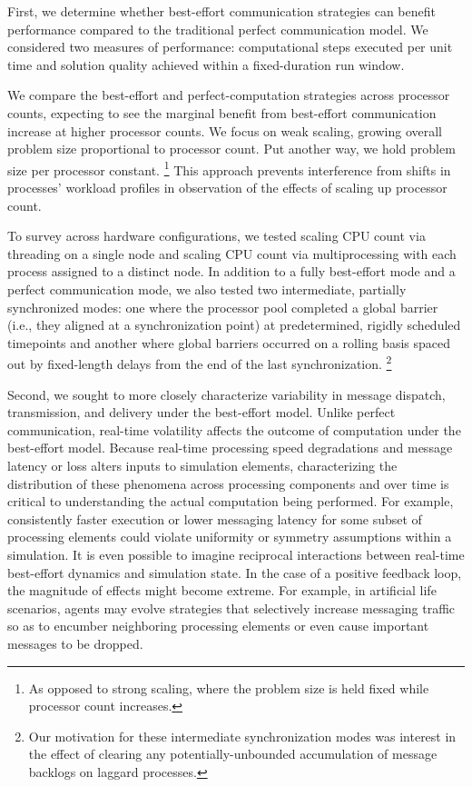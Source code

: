 First, we determine whether best-effort communication strategies can benefit performance compared to the traditional perfect communication model.
We considered two measures of performance: computational steps executed per unit time and solution quality achieved within a fixed-duration run window.

We compare the best-effort and perfect-computation strategies across processor counts, expecting to see the marginal benefit from best-effort communication increase at higher processor counts.
We focus on weak scaling, growing overall problem size proportional to processor count.
Put another way, we hold problem size per processor constant.%
\footnote{
As opposed to strong scaling, where the problem size is held fixed while processor count increases.
}
This approach prevents interference from shifts in processes' workload profiles in observation of the effects of scaling up processor count.

To survey across hardware configurations, we tested scaling CPU count via threading on a single node and scaling CPU count via multiprocessing with each process assigned to a distinct node.
In addition to a fully best-effort mode and a perfect communication mode, we also tested two intermediate, partially synchronized modes: one where the processor pool completed a global barrier (i.e., they aligned at a synchronization point) at predetermined, rigidly scheduled timepoints and another where global barriers occurred on a rolling basis spaced out by fixed-length delays from the end of the last synchronization.%
\footnote{
Our motivation for these intermediate synchronization modes was interest in the effect of clearing any potentially-unbounded accumulation of message backlogs on laggard processes.
}

Second, we sought to more closely characterize variability in message dispatch, transmission, and delivery under the best-effort model.
Unlike perfect communication, real-time volatility affects the outcome of computation under the best-effort model.
Because real-time processing speed degradations and message latency or loss alters inputs to simulation elements, characterizing the distribution of these phenomena across processing components and over time is critical to understanding the actual computation being performed.
For example, consistently faster execution or lower messaging latency for some subset of processing elements could violate uniformity or symmetry assumptions within a simulation.
It is even possible to imagine reciprocal interactions between real-time best-effort dynamics and simulation state.
In the case of a positive feedback loop, the magnitude of effects might become extreme.
For example, in artificial life scenarios, agents may evolve strategies that selectively increase messaging traffic so as to encumber neighboring processing elements or even cause important messages to be dropped.

